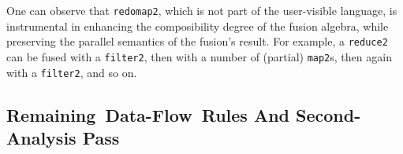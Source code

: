 \documentclass{sigplanconf}  %
\begin{document}

One can observe that {\tt redomap2}, which is not part of the user-visible language, 
is instrumental in enhancing the composibility degree of the fusion algebra, 
while preserving the parallel semantics of the fusion's result. 
For example, a {\tt reduce2} can be fused with a {\tt filter2}, then with a 
number of (partial) {\tt map2}s, then again with a {\tt filter2}, and so on. 
  

\subsection{Remaining~Data-Flow~Rules And Second-Analysis Pass}
\label{sec:bwdPass}
\end{document}
